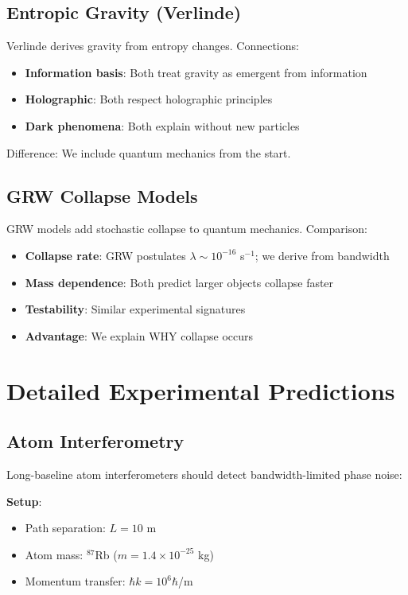 \documentclass[twocolumn,prd,amsmath,amssymb,aps,superscriptaddress,nofootinbib]{revtex4-2}
\begin{document}
\subsection{Entropic Gravity (Verlinde)}

Verlinde derives gravity from entropy changes. Connections:
\begin{itemize}
\item \textbf{Information basis}: Both treat gravity as emergent from information
\item \textbf{Holographic}: Both respect holographic principles  
\item \textbf{Dark phenomena}: Both explain without new particles
\end{itemize}

Difference: We include quantum mechanics from the start.

\subsection{GRW Collapse Models}

GRW models add stochastic collapse to quantum mechanics. Comparison:
\begin{itemize}
\item \textbf{Collapse rate}: GRW postulates $\lambda \sim 10^{-16}$ s$^{-1}$; we derive from bandwidth
\item \textbf{Mass dependence}: Both predict larger objects collapse faster
\item \textbf{Testability}: Similar experimental signatures
\item \textbf{Advantage}: We explain WHY collapse occurs
\end{itemize}

\section{Detailed Experimental Predictions}
\label{sec:experiments}

\subsection{Atom Interferometry}

Long-baseline atom interferometers should detect bandwidth-limited phase noise:

\textbf{Setup}: 
\begin{itemize}
\item Path separation: $L = 10$ m
\item Atom mass: $^{87}$Rb ($m = 1.4 \times 10^{-25}$ kg)
\item Momentum transfer: $\hbar k = 10^6 \hbar$/m
\end{itemize}
\end{document}
